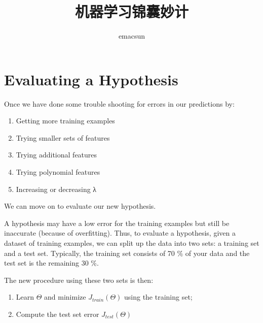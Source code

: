 \documentclass[10pt,a4paper,UTF8]{article}
\author{emacsun}
\date{}
\title{机器学习锦囊妙计}
\begin{document}
\maketitle
\tableofcontents
{}
\section{Evaluating a Hypothesis}
\label{sec:orgb7381d4}


Once we have done some trouble shooting for errors in our predictions by:

\begin{enumerate}
\item Getting more training examples
\item Trying smaller sets of features
\item Trying additional features
\item Trying polynomial features
\item Increasing or decreasing λ
\end{enumerate}

We can move on to evaluate our new hypothesis.

A hypothesis may have a low error for the training examples but still be inaccurate (because of overfitting). Thus, to evaluate a hypothesis, given a dataset of training examples, we can split up the data into two sets: a training set and a test set. Typically, the training set consists of 70 \% of your data and the test set is the remaining 30 \%.

The new procedure using these two sets is then:

\begin{enumerate}
\item Learn \(\Theta\) and minimize \(J_{train}(\Theta)\) using the training set;
\item Compute the test set error \(J_{test}(\Theta)\)
\end{enumerate}
\end{document}
